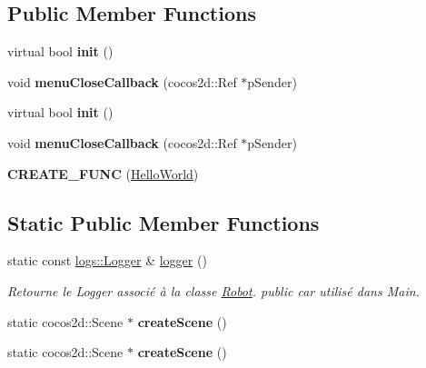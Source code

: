 \subsection*{Public Member Functions}
\begin{DoxyCompactItemize}
\item 
\mbox{\label{classHelloWorld_a65e2b1525051f3690e5a39ca56608a97}} 
virtual bool {\bfseries init} ()
\item 
\mbox{\label{classHelloWorld_ac4ab2f5e922e659d4f137591c0f6a9b0}} 
void {\bfseries menu\+Close\+Callback} (cocos2d\+::\+Ref $\ast$p\+Sender)
\item 
\mbox{\label{classHelloWorld_a4ceda162283e0dd8c5b3c51533b4cb55}} 
virtual bool {\bfseries init} ()
\item 
\mbox{\label{classHelloWorld_ac4ab2f5e922e659d4f137591c0f6a9b0}} 
void {\bfseries menu\+Close\+Callback} (cocos2d\+::\+Ref $\ast$p\+Sender)
\item 
\mbox{\label{classHelloWorld_a857ebfbc49f3a7f81772bee4991d186b}} 
{\bfseries C\+R\+E\+A\+T\+E\+\_\+\+F\+U\+NC} (\hyperlink{classHelloWorld}{Hello\+World})
\end{DoxyCompactItemize}
\subsection*{Static Public Member Functions}
\begin{DoxyCompactItemize}
\item 
\mbox{\label{classHelloWorld_aa573644de81d869feef5d5db8a4b26d5}} 
static const \hyperlink{classlogs_1_1Logger}{logs\+::\+Logger} \& \hyperlink{classHelloWorld_aa573644de81d869feef5d5db8a4b26d5}{logger} ()
\begin{DoxyCompactList}\small\item\em Retourne le Logger associé à la classe \hyperlink{classRobot}{Robot}. public car utilisé dans Main. \end{DoxyCompactList}\item 
\mbox{\label{classHelloWorld_a1b700f5f9de04271533d3fa099d7b014}} 
static cocos2d\+::\+Scene $\ast$ {\bfseries create\+Scene} ()
\item 
\mbox{\label{classHelloWorld_ad8fce98d32793fee264ea5f0acd98fb3}} 
static cocos2d\+::\+Scene $\ast$ {\bfseries create\+Scene} ()
\end{DoxyCompactItemize}


